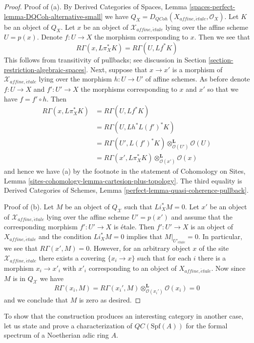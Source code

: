 \documentclass{stacks-project}
\theoremstyle{plain}
\theoremstyle{definition}
\theoremstyle{remark}
\numberwithin{equation}{subsection}
\def\etale{{\acute{e}tale}}
\def\QCoh{\mathit{QCoh}}
\begin{document}
\begin{proof}
\medskip\noindent
Proof of (a). By Derived Categories of Spaces, Lemma
\ref{spaces-perfect-lemma-DQCoh-alternative-small}
we have $Q_X = D_\QCoh(X_{affine, \etale}, \mathcal{O}_X)$.
Let $K$ be an object of $Q_X$. Let $x$ be an object of
$\mathcal{X}_{affine, \etale}$ lying over the affine
scheme $U = p(x)$. Denote $f : U \to X$ the morphism corresponding
to $x$. Then we see that
$$
R\Gamma(x, L\pi_X^*K) = R\Gamma(U, Lf^*K)
$$
This follows from transitivity of pullbacks; see discussion in
Section \ref{section-restriction-algebraic-spaces}.
Next, suppose that $x \to x'$ is a morphism of $\mathcal{X}_{affine, \etale}$
lying over the morphism $h : U \to U'$ of affine schemes.
As before denote $f : U \to X$ and $f' : U' \to X$ the morphisms
corresponding to $x$ and $x'$ so that we have $f = f' \circ h$.
Then
\begin{align*}
R\Gamma(x, L\pi_X^*K)
& =
R\Gamma(U, Lf^*K) \\
& =
R\Gamma(U, Lh^*L(f')^*K) \\
& =
R\Gamma(U', L(f')^*K) \otimes_{\mathcal{O}(U')}^\mathbf{L} \mathcal{O}(U) \\
& =
R\Gamma(x', L\pi_X^*K) \otimes_{\mathcal{O}(x')}^\mathbf{L} \mathcal{O}(x)
\end{align*}
and hence we have (a) by the footnote in the statement of
Cohomology on Sites, Lemma
\ref{sites-cohomology-lemma-cartesion-plus-topology}. The third equality is
Derived Categories of Schemes, Lemma
\ref{perfect-lemma-quasi-coherence-pullback}.

\medskip\noindent
Proof of (b). Let $M$ be an object of $Q_\mathcal{X}$
such that $Li_X^*M = 0$. Let $x'$ be an object of $\mathcal{X}_{affine, \etale}$
lying over the affine scheme $U' = p(x')$ and assume that the corresponding
morphism $f' : U' \to X$ is \'etale. Then $f' : U' \to X$ is an object of
$X_{affine, \etale}$ and the condition $Li_X^*M = 0$ implies that
$M|_{U'_\etale} = 0$. In particular, we see that $R\Gamma(x', M) = 0$.
However, for an arbitrary object $x$ of the site
$\mathcal{X}_{affine, \etale}$ there exists a covering $\{x_i \to x\}$
such that for each $i$ there is a morphism $x_i \to x'_i$ with
$x'_i$ corresponding to an object of $X_{affine, \etale}$.
Now since $M$ is in $Q_\mathcal{X}$ we have
$$
R\Gamma(x_i, M) =
R\Gamma(x_i', M) \otimes_{\mathcal{O}(x_i')}^\mathbf{L} \mathcal{O}(x_i) =
0
$$
and we conclude that $M$ is zero as desired.
\end{proof}

\noindent
To show that the construction produces an interesting category in another
case, let us state and prove a characterization of
$\mathit{QC}(\text{Spf}(A))$ for the formal spectrum of
a Noetherian adic ring $A$.
\end{document}
